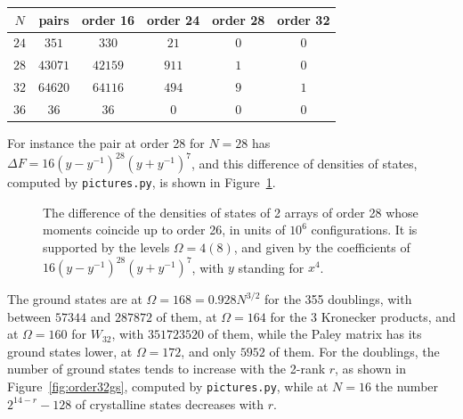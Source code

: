 \documentclass[11pt,a4paper]{article}
\theoremstyle{remark}
\begin{document}
\medskip

\begin{center}
\begin{tabular}{|c|c|c|c|c|c|}
\hline
$N$ & pairs & order 16 & order 24 & order 28 & order 32\\
\hline
$24$ & $351$ & $330$ & $21$ & $0$ & $0$\\
$28$ & $43071$ & $42159$ & $911$ & $1$ & $0$\\
$32$ & $64620$ & $64116$ & $494$ & $9$ & $1$\\
$36$ & $36$ & $36$ & $0$ & $0$ & $0$\\
\hline
\end{tabular}
\end{center}

\medskip

\noindent For instance the pair at order 28 for $N=28$ has $\Delta F=16(y-y^{-1})^{28}(y+y^{-1})^7$, and this difference of densities of states, computed by \texttt{pictures.py}, is shown in Figure~\ref{fig:pair28}.

\begin{figure}[htb!]
\centering
{}
\caption{The difference of the densities of states of 2 arrays of order 28 whose moments coincide up to order 26, in units of $10^6$ configurations. It is supported by the levels $\Omega=4(8)$, and given by the coefficients of $16(y-y^{-1})^{28}(y+y^{-1})^7$, with $y$ standing for $x^4$.}\label{fig:pair28}
\end{figure} The ground states are at $\Omega=168=0.928N^{3/2}$ for the 355 doublings, with between $57344$ and $287872$ of them, at $\Omega=164$ for the 3 Kronecker products, and at $\Omega=160$ for $W_{32}$, with $351723520$ of them, while the Paley matrix has its ground states lower, at $\Omega=172$, and only $5952$ of them. For the doublings, the number of ground states tends to increase with the 2-rank $r$, as shown in Figure~\ref{fig:order32gs}, computed by \texttt{pictures.py}, while at $N=16$ the number $2^{14-r}-128$ of crystalline states decreases with $r$.
\end{document}
